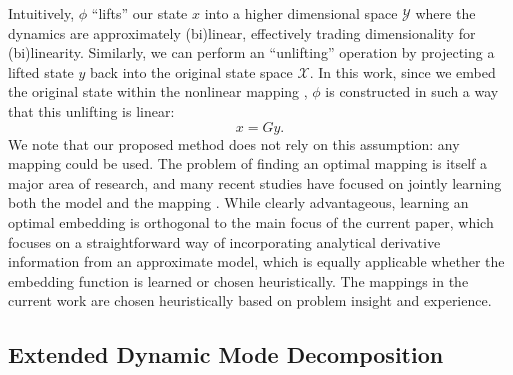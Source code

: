 \documentclass[../root.tex]{subfiles}
\newcommand{\changed}[1]{{\color{black} #1}}
\begin{document}
Intuitively, $\phi$ ``lifts'' our state $x$ into a higher dimensional space $\mathcal{Y}$
where the dynamics are approximately (bi)linear, effectively trading dimensionality for
(bi)linearity. Similarly, we can perform an ``unlifting'' operation by projecting a lifted state
$y$ back into the original state space $\mathcal{X}$. In this work, 
\changed{since we embed the original state within the nonlinear mapping 
\cite{bruder_Advantages_2021,folkestad_Koopman_2021,mamakoukas_Local_2019,huang_Feedback_2018,ma_Optimal_2019}
}, 
$\phi$ is constructed in such a way that this unlifting is linear:
\begin{equation}
	x = G y.
\end{equation}
\changed{We note that our proposed method does not rely on this assumption: any mapping could be used. The 
problem of finding an optimal mapping is itself a major area of research, and many recent studies have focused
on jointly learning both the model and the mapping
\cite{folkestad_Extended_2020,folkestad_KoopNet_2022,wang_Deep_2021,kaiser_Datadriven_2021,
li_Extended_2017}.
While clearly advantageous, learning
an optimal embedding is orthogonal to the main focus of the current paper, which focuses on a straightforward
way of incorporating analytical derivative information from an approximate model, which is equally applicable
whether the embedding function is learned or chosen heuristically.
The mappings in the current work are chosen heuristically based on problem insight and experience.}


\subsection{Extended Dynamic Mode Decomposition} \label{sec:edmd}
\end{document}
